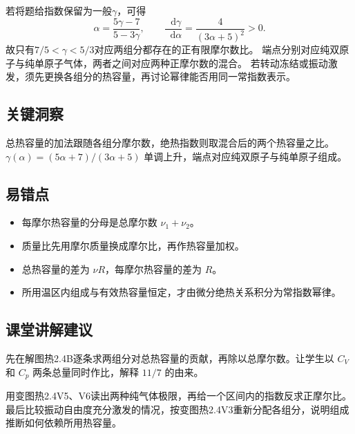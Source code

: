 \documentclass[UTF8,fontset=fandol,a4paper,11pt]{ctexart}
\newcommand{\dd}{\mathop{}\!\mathrm{d}}
\begin{document}
若将题给指数保留为一般$\gamma$，可得
\[
\alpha=\frac{5\gamma-7}{5-3\gamma},\qquad
\frac{\dd\gamma}{\dd\alpha}=\frac4{(3\alpha+5)^2}>0.
\]
故只有$7/5<\gamma<5/3$对应两组分都存在的正有限摩尔数比。
端点分别对应纯双原子与纯单原子气体，两者之间对应两种正摩尔数的混合。
若转动冻结或振动激发，须先更换各组分的热容量，再讨论幂律能否用同一常指数表示。




\subsection*{关键洞察}

总热容量的加法跟随各组分摩尔数，绝热指数则取混合后的两个热容量之比。$\gamma(\alpha)=(5\alpha+7)/(3\alpha+5)$ 单调上升，端点对应纯双原子与纯单原子组成。



\subsection*{易错点}

\begin{itemize}
\item 每摩尔热容量的分母是总摩尔数 $\nu_1+\nu_2$。
\item 质量比先用摩尔质量换成摩尔比，再作热容量加权。
\item 总热容量的差为 $\nu R$，每摩尔热容量的差为 $R$。
\item 所用温区内组成与有效热容量恒定，才由微分绝热关系积分为常指数幂律。
\end{itemize}



\subsection*{课堂讲解建议}

先在解图热2.4B逐条求两组分对总热容量的贡献，再除以总摩尔数。让学生以 $C_V$ 和 $C_p$ 两条总量同时作比，解释 $11/7$ 的由来。

用变图热2.4V5、V6读出两种纯气体极限，再给一个区间内的指数反求正摩尔比。最后比较振动自由度充分激发的情况，按变图热2.4V3重新分配各组分，说明组成推断如何依赖所用热容量。

\end{document}
